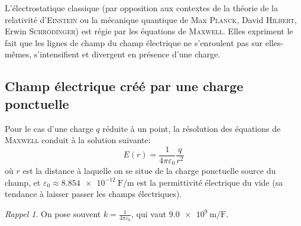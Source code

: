 \documentclass{article}
\renewcommand\epsilon\varepsilon
\theoremstyle{definition}
\theoremstyle{remark}
\newtheorem*{rap}{Rappel}
\begin{document}
L'électrostatique classique (par opposition aux contextes de la théorie de la relativité d'\textsc{Einstein} ou la mécanique quantique de Max \textsc{Planck}, David \textsc{Hilbert}, Erwin \textsc{Schrödinger}) est régie par les équations de \textsc{Maxwell}. Elles expriment le fait que les lignes de champ du champ électrique ne s'enroulent pas sur elles-mêmes, s'intensifient et divergent en présence d'une charge.

\subsection{Champ électrique créé par une charge ponctuelle}

Pour le cas d'une charge $q$ réduite à un point, la résolution des équations de \textsc{Maxwell} conduit à la solution suivante:
	\[ E(r) = \frac{1}{4\pi\epsilon_0}\frac{q}{r^2} \]
où $r$ est la distance à laquelle on se situe de la charge ponctuelle source du champ, et $\epsilon_0\approx\SI{8.854e-12}{\farad\per\meter}$ est la permittivité électrique du vide (sa tendance à laisser passer les champs électriques).

\begin{rap}
	On pose souvent $k=\frac{1}{4\pi\epsilon_0}$, qui vaut $\SI{9.0e9}{\meter\per\farad}.$
\end{rap}
\end{document}
